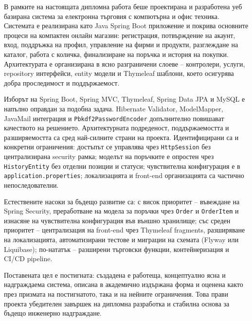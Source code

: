 В рамките на настоящата дипломна работа беше проектирана и разработена уеб базирана система за електронна търговия с компютърна и офис техника. Системата е реализирана като Java Spring Boot приложение и покрива основните процеси на компактен онлайн магазин: регистрация, потвърждение на акаунт, вход, поддръжка на профил, управление на фирми и продукти, разглеждане на каталог, работа с количка, финализиране на поръчка и история на покупки. Архитектурата е организирана в ясно разграничени слоеве -- контролери, услуги, repository интерфейси, entity модели и Thymeleaf шаблони, което осигурява добра проследимост и поддържаемост.

Изборът на Spring Boot, Spring MVC, Thymeleaf, Spring Data JPA и MySQL е напълно оправдан за подобна задача. Hibernate Validator, ModelMapper, JavaMail интеграция и \texttt{Pbkdf2PasswordEncoder} допълнително повишават качеството на решението. Архитектурната подреденост, поддържаемостта и разширяемостта са сред най-силните страни на проекта. Идентифицирани са и конкретни ограничения: достъпът се управлява чрез \texttt{HttpSession} без централизирана security рамка; моделът на поръчките е опростен чрез \texttt{HistoryEntity} без отделни позиции и статуси; чувствителна конфигурация е в \texttt{application.properties}; локализацията и front-end организацията са частично непоследователни.

Естествените насоки за бъдещо развитие са: с висок приоритет -- въвеждане на Spring Security, преработване на модела за поръчки чрез \texttt{Order} и \texttt{OrderItem} и изнасяне на чувствителна конфигурация във външно хранилище; със среден приоритет -- централизация на front-end чрез Thymeleaf fragments, разширяване на локализацията, автоматизирани тестове и миграции на схемата (Flyway или Liquibase); по-нататък -- разширени търговски функции, контейнеризация и CI/CD pipeline.

Поставената цел е постигната: създадена е работеща, концептуално ясна и надграждаема система, описана в академично издържана форма и оценена както през призмата на постигнатото, така и на нейните ограничения. Това прави проекта убедителен завършек на дипломна разработка и стабилна основа за бъдещо инженерно надграждане.
